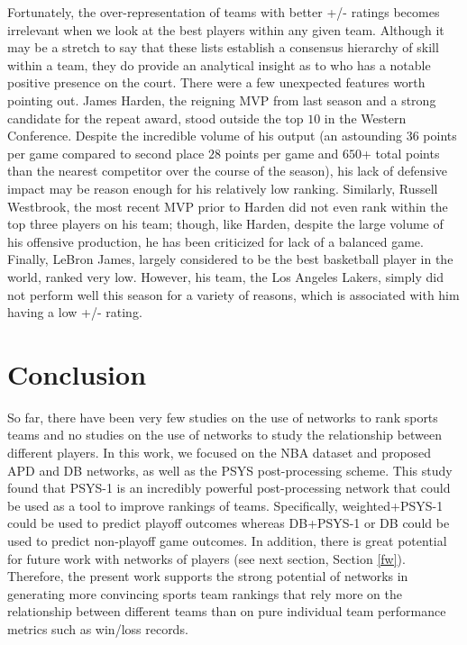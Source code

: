 \documentclass[12pt]{article}%
\begin{document}
\null\quad\quad Fortunately, the over-representation of teams with better +/- ratings becomes irrelevant when we look at the best players within any given team. Although it may be a stretch to say that these lists establish a consensus hierarchy of skill within a team, they do provide an analytical insight as to who has a notable positive presence on the court. There were a few unexpected features worth pointing out. James Harden, the reigning MVP from last season and a strong candidate for the repeat award, stood outside the top $10$ in the Western Conference. Despite the incredible volume of his output (an astounding $36$ points per game compared to second place $28$ points per game and $650$+ total points than the nearest competitor over the course of the season), his lack of defensive impact may be reason enough for his relatively low ranking. Similarly, Russell Westbrook, the most recent MVP prior to Harden did not even rank within the top three players on his team; though, like Harden, despite the large volume of his offensive production, he has been criticized for lack of a balanced game. Finally, LeBron James, largely considered to be the best basketball player in the world, ranked very low. However, his team, the Los Angeles Lakers, simply did not perform well this season for a variety of reasons, which is associated with him having a low +/- rating.\\

\section{Conclusion}
\label{concl}
\null\quad\quad So far, there have been very few studies on the use of networks to rank sports teams and no studies on the use of networks to study the relationship between different players. In this work, we focused on the NBA dataset and proposed APD and DB networks, as well as the PSYS post-processing scheme. This study found that PSYS-1 is an incredibly powerful post-processing network that could be used as a tool to improve rankings of teams. Specifically, weighted+PSYS-1 could be used to predict playoff outcomes whereas DB+PSYS-1 or DB could be used to predict non-playoff game outcomes. In addition, there is great potential for future work with networks of players (see next section, Section \ref{fw}). Therefore, the present work supports the strong potential of networks in generating more convincing sports team rankings that rely more on the relationship between different teams than on pure individual team performance metrics such as win/loss records.
\end{document}
